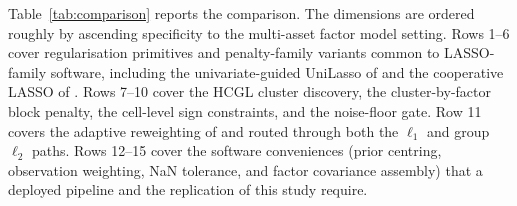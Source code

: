 \documentclass[article]{jss}
\begin{document}
Table~\ref{tab:comparison} reports the comparison. The dimensions are
ordered roughly by ascending specificity to the multi-asset factor
model setting. Rows 1--6 cover regularisation primitives and
penalty-family variants common to LASSO-family software, including the
univariate-guided UniLasso of \cite{Chatterjee+Hastie+Tibshirani:2025}
and the cooperative LASSO of \cite{Chiquet+Grandvalet+Charbonnier:2012}.
Rows 7--10 cover the HCGL cluster discovery, the cluster-by-factor block
penalty, the cell-level sign constraints, and the noise-floor gate. Row 11
covers the adaptive reweighting of \cite{Zou:2006} and
\cite{Wang+Leng:2008} routed through both the $\ell_1$ and group $\ell_2$ paths.
Rows 12--15 cover the software conveniences (prior centring, observation
weighting, NaN tolerance, and factor covariance assembly) that a deployed
pipeline and the replication of this study require.
\end{document}
